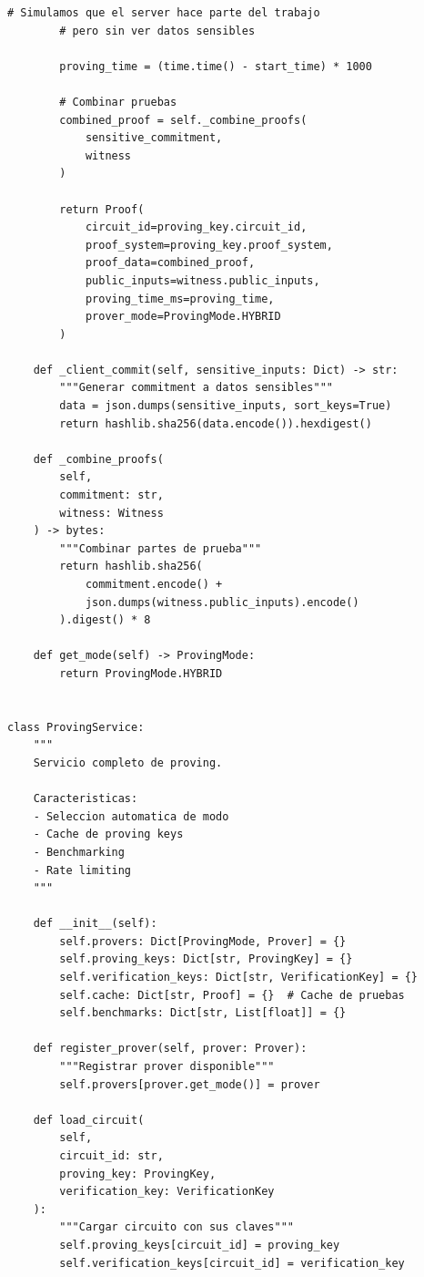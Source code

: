 \documentclass[11pt,a4paper,twoside]{book}
\theoremstyle{definition}
\theoremstyle{remark}
\begin{document}
\begin{lstlisting}[style=python, caption={Infraestructura de proving ZK}]
        # Simulamos que el server hace parte del trabajo
        # pero sin ver datos sensibles
        
        proving_time = (time.time() - start_time) * 1000
        
        # Combinar pruebas
        combined_proof = self._combine_proofs(
            sensitive_commitment,
            witness
        )
        
        return Proof(
            circuit_id=proving_key.circuit_id,
            proof_system=proving_key.proof_system,
            proof_data=combined_proof,
            public_inputs=witness.public_inputs,
            proving_time_ms=proving_time,
            prover_mode=ProvingMode.HYBRID
        )
    
    def _client_commit(self, sensitive_inputs: Dict) -> str:
        """Generar commitment a datos sensibles"""
        data = json.dumps(sensitive_inputs, sort_keys=True)
        return hashlib.sha256(data.encode()).hexdigest()
    
    def _combine_proofs(
        self,
        commitment: str,
        witness: Witness
    ) -> bytes:
        """Combinar partes de prueba"""
        return hashlib.sha256(
            commitment.encode() +
            json.dumps(witness.public_inputs).encode()
        ).digest() * 8
    
    def get_mode(self) -> ProvingMode:
        return ProvingMode.HYBRID


class ProvingService:
    """
    Servicio completo de proving.
    
    Caracteristicas:
    - Seleccion automatica de modo
    - Cache de proving keys
    - Benchmarking
    - Rate limiting
    """
    
    def __init__(self):
        self.provers: Dict[ProvingMode, Prover] = {}
        self.proving_keys: Dict[str, ProvingKey] = {}
        self.verification_keys: Dict[str, VerificationKey] = {}
        self.cache: Dict[str, Proof] = {}  # Cache de pruebas
        self.benchmarks: Dict[str, List[float]] = {}
        
    def register_prover(self, prover: Prover):
        """Registrar prover disponible"""
        self.provers[prover.get_mode()] = prover
    
    def load_circuit(
        self,
        circuit_id: str,
        proving_key: ProvingKey,
        verification_key: VerificationKey
    ):
        """Cargar circuito con sus claves"""
        self.proving_keys[circuit_id] = proving_key
        self.verification_keys[circuit_id] = verification_key
    

\end{lstlisting}
\end{document}
